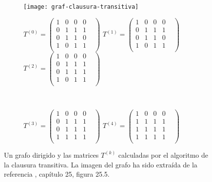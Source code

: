 \begin{figure}[htb]
	\centering
	\begin{subfigure}{\linewidth}
		\texttt{[image: graf-clausura-transitiva]}
	\end{subfigure}
	
	\begin{subfigure}{\linewidth}
		$T^{(0)}=\begin{pmatrix}
			1 & 0 & 0 & 0 &\\
			0 & 1 & 1 & 1 \\
			0 & 1 & 1 & 0 \\
			1 & 0 & 1 & 1 \\
		\end{pmatrix}$
		$T^{(1)}=\begin{pmatrix}
			1 & 0 & 0 & 0 &\\
			0 & 1 & 1 & 1 \\
			0 & 1 & 1 & 0 \\
			1 & 0 & 1 & 1 \\
		\end{pmatrix}$
		$T^{(2)}=\begin{pmatrix}
			1 & 0 & 0 & 0 &\\
			0 & 1 & 1 & 1 \\
			0 & 1 & 1 & 1 \\
			1 & 0 & 1 & 1 \\
		\end{pmatrix}$
	\end{subfigure} \\
	\vspace{0.5cm}
	\begin{subfigure}{\linewidth}
		$T^{(3)}=\begin{pmatrix}
			1 & 0 & 0 & 0 &\\
			0 & 1 & 1 & 1 \\
			0 & 1 & 1 & 1 \\
			1 & 1 & 1 & 1 \\
		\end{pmatrix}$
		$T^{(4)}=\begin{pmatrix}
			1 & 0 & 0 & 0 &\\
			1 & 1 & 1 & 1 \\
			1 & 1 & 1 & 1 \\
			1 & 1 & 1 & 1 \\
		\end{pmatrix}$
	\end{subfigure}
	\caption{Un grafo dirigido y las matrices $T^{(k)}$ calculadas por el algoritmo de la clausura transitiva. La imagen del grafo ha sido extraída de la referencia \cite{algorithms}, capítulo 25, figura 25.5.}
	\label{fig:claus-trans}
\end{figure} 


